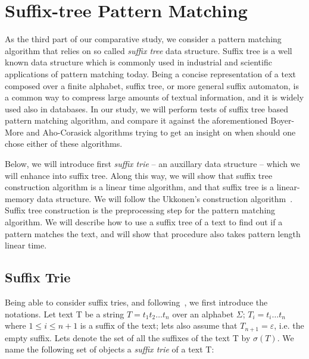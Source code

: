 \documentclass[paper=a4, fontsize=11pt]{scrartcl} %
\numberwithin{equation}{section} %
\numberwithin{figure}{section} %
\numberwithin{table}{section} %
\begin{document}
\section{Suffix-tree Pattern Matching}
\par As the third part of our comparative study, we consider a pattern matching algorithm that relies on so called \textit{suffix tree} data structure. Suffix tree is a well known data structure which is commonly used in industrial and scientific applications of pattern matching today. Being a concise representation of a text composed over a finite alphabet, suffix tree, or more general suffix automaton, is a common way to compress large amounts of textual information, and it is widely used also in databases. In our study, we will perform tests of suffix tree based pattern matching algorithm, and compare it against the aforementioned Boyer-More and Aho-Corasick algorithms trying to get an insight on when should one chose either of these algorithms.

\par Below, we will introduce first \textit{suffix trie} -- an auxillary data structure -- which we will enhance into suffix tree. Along this way, we will show that suffix tree construction algorithm is a linear time algorithm, and that suffix tree is a linear-memory data structure. We will follow the Ukkonen's construction algorithm~\cite{ukkonen1995line}. Suffix tree construction is the preprocessing step for the pattern matching algorithm. We will describe how to use a suffix tree of a text to find out if a pattern matches the text, and will show that procedure also takes pattern length linear time.

\subsection{Suffix Trie}
\par Being able to consider suffix tries, and following~\cite{ukkonen1995line}, we first introduce the notations. Let text T be a string $T = t_1 t_2 \dots t_n$ over an alphabet $\Sigma$; $T_i = t_i \dots t_n$ where $1 \leq i \leq n+1$ is a suffix of the text; lets also assume that $T_{n+1} = \varepsilon$, i.e. the empty suffix. Lets denote the set of all the suffixes of the text T by $\sigma(T)$. We name the following set of objects a \textit{suffix trie} of a text T:
\end{document}
